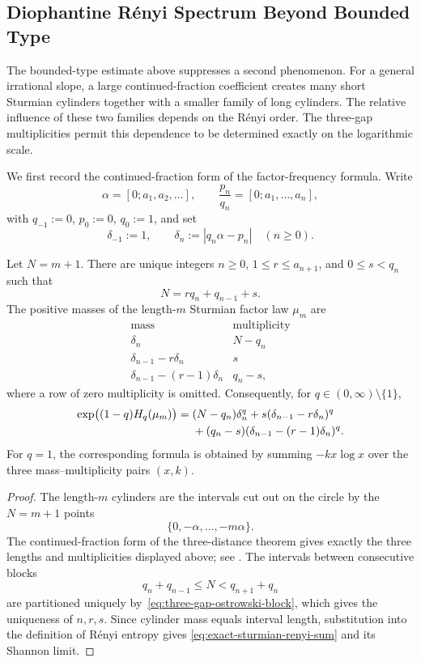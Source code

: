 \subsection{Diophantine R\'enyi Spectrum Beyond Bounded Type}

The bounded-type estimate above suppresses a second phenomenon. For a general
irrational slope, a large continued-fraction coefficient creates many short
Sturmian cylinders together with a smaller family of long cylinders. The
relative influence of these two families depends on the R\'enyi order. The
three-gap multiplicities permit this dependence to be determined exactly on
the logarithmic scale.

We first record the continued-fraction form of the factor-frequency formula.
Write
\[
\alpha=[0;a_1,a_2,\ldots],
\qquad
\frac{p_n}{q_n}=[0;a_1,\ldots,a_n],
\]
with \(q_{-1}:=0\), \(p_0:=0\), \(q_0:=1\), and set
\[
\delta_{-1}:=1,
\qquad
\delta_n:=|q_n\alpha-p_n|\quad(n\ge0).
\]

\begin{lemma}
\label{lem:exact-sturmian-frequency-profile}
Let \(N=m+1\). There are unique integers \(n\ge0\),
\(1\le r\le a_{n+1}\), and \(0\le s<q_n\) such that
\begin{equation}\label{eq:three-gap-ostrowski-block}
N=r q_n+q_{n-1}+s.
\end{equation}
The positive masses of the length-\(m\) Sturmian factor law \(\mu_m\) are
\[
\begin{array}{c|c}
\text{mass}&\text{multiplicity}\\ \hline
\delta_n&N-q_n\\
\delta_{n-1}-r\delta_n&s\\
\delta_{n-1}-(r-1)\delta_n&q_n-s,
\end{array}
\]
where a row of zero multiplicity is omitted. Consequently, for
\(q\in(0,\infty)\setminus\{1\}\),
\begin{align}
\exp\bigl((1-q)H_q(\mu_m)\bigr)
={}&(N-q_n)\delta_n^q
+s(\delta_{n-1}-r\delta_n)^q \notag\\
&+(q_n-s)(\delta_{n-1}-(r-1)\delta_n)^q.
\label{eq:exact-sturmian-renyi-sum}
\end{align}
For \(q=1\), the corresponding formula is obtained by summing
\(-k x\log x\) over the three mass--multiplicity pairs \((x,k)\).
\end{lemma}

\begin{proof}
The length-\(m\) cylinders are the intervals cut out on the circle by the
\(N=m+1\) points
\[
\{0,-\alpha,\ldots,-m\alpha\}.
\]
The continued-fraction
form of the three-distance theorem gives exactly the three lengths and
multiplicities displayed above; see
\cite{Slater1967GapsSteps,Berthe1996SturmianFrequencies}. The intervals
between consecutive blocks
\[
q_n+q_{n-1}\le N<q_{n+1}+q_n
\]
are partitioned uniquely by~\eqref{eq:three-gap-ostrowski-block}, which gives
the uniqueness of \(n,r,s\). Since cylinder mass equals interval length,
substitution into the definition of R\'enyi entropy gives
\eqref{eq:exact-sturmian-renyi-sum} and its Shannon limit.
\end{proof}

